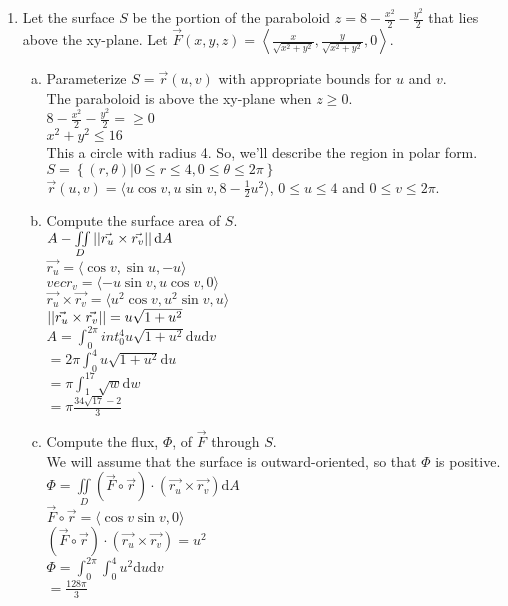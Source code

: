 \begin{enumerate}
	\item Let the surface $S$ be the portion of the paraboloid $z=8-\frac{x^2}{2}-\frac{y^2}{2}$ that lies above the xy-plane. Let $\vec{F}(x,y,z)=\left< \frac{x}{\sqrt{x^2+y^2}}, \frac{y}{\sqrt{x^2+y^2}}, 0\right>$.
	\begin{enumerate}[a.]
		\item Parameterize $S=\vec{r}(u,v)$ with appropriate bounds for $u$ and $v$.\\
		\indent
		The paraboloid is above the xy-plane when $z\geq0$.\\
		$8-\frac{x^2}{2}-\frac{y^2}{2}=\geq 0$\\
		$x^2+y^2\leq 16$\\
		This a circle with radius 4. So, we'll describe the region in polar form.\\
		$S=\left\{(r,\theta)|0\leq r\leq 4, 0\leq\theta\leq 2\pi\right\}$\\
		$\vec{r}(u,v)=\langle u\cos{v},u\sin{v},8-\frac{1}{2}u^2\rangle$, $0\leq u\leq 4$ and $0\leq v\leq 2\pi$.\\
		
		\item Compute the surface area of $S$.\\
		\indent
		$A-\iint\limits_{D}{\left|\left|\vec{r_u}\times\vec{r_v}\right|\right|\mathrm{d}A}$\\
		$\vec{r_u}=\langle\cos{v},\sin{u},-u\rangle$\\
		$vec{r_v}=\langle -u\sin{v},u\cos{v},0\rangle$\\
		$\vec{r_u}\times\vec{r_v}=\langle u^2\cos{v},u^2\sin{v},u\rangle$\\
		$\left|\left|\vec{r_u}\times\vec{r_v}\right|\right|=u\sqrt{1+u^2}$\\
		$A=\int_{0}^{2\pi}{int_{0}^{4}{u\sqrt{1+u^2}\mathrm{d}u}\mathrm{d}v}$\\
		$=2\pi\int_{0}^{4}{u\sqrt{1+u^2}\mathrm{d}u}$\\
		$=\pi\int_{1}^{17}{\sqrt{w}\mathrm{d}w}$\\
		$=\pi\frac{34\sqrt{17}-2}{3}$\\
		
		\item Compute the flux, $\Phi$, of $\vec{F}$ through $S$.\\
		\indent
		We will assume that the surface is outward-oriented, so that $\Phi$ is positive.\\
		$\Phi=\iint\limits_{D}{\left(\vec{F}\circ\vec{r}\right)\cdot\left(\vec{r_u}\times\vec{r_v}\right)\mathrm{d}A}$\\
		$\vec{F}\circ\vec{r}=\langle\cos{v}\sin{v},0\rangle$\\
		$\left(\vec{F}\circ\vec{r}\right)\cdot\left(\vec{r_u}\times\vec{r_v}\right)=u^2$\\
		$\Phi=\int_{0}^{2\pi}{\int_{0}^{4}{u^2\mathrm{d}u}\mathrm{d}v}$\\
		$=\frac{128\pi}{3}$\\
	\end{enumerate}
	

\end{enumerate}
